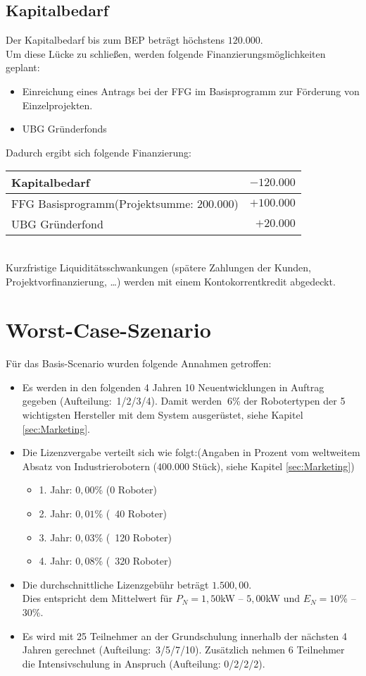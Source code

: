 \subsection{Kapitalbedarf}
Der Kapitalbedarf bis zum BEP beträgt höchstens $120.000$\officialeuro.\\
Um diese Lücke zu schließen, werden folgende Finanzierungsmöglichkeiten geplant:
\begin{itemize}
	\item Einreichung eines Antrags bei der FFG im Basisprogramm zur Förderung von Einzelprojekten.
	\item UBG Gründerfonds
\end{itemize}
Dadurch ergibt sich folgende Finanzierung:\\
\begin{tabular}{l r}
	Kapitalbedarf & $-120.000$\officialeuro \\
	\hline
	FFG Basisprogramm(Projektsumme: $200.000$\officialeuro) & $+100.000$\officialeuro \\
	UBG Gründerfond & $+20.000$\officialeuro \\
	\bottomrule
\end{tabular}\\

\noindent Kurzfristige Liquiditätsschwankungen (spätere Zahlungen der Kunden, Projektvorfinanzierung, …) werden mit einem Kontokorrentkredit abgedeckt.

\newpage
\section{Worst-Case-Szenario}
Für das Basis-Scenario wurden folgende Annahmen getroffen:
\begin{itemize}
	\item Es werden in den folgenden 4 Jahren 10 Neuentwicklungen in Auftrag gegeben (Aufteilung:~1/2/3/4). Damit werden $~6$\% der Robotertypen der 5 wichtigsten Hersteller mit dem System ausgerüstet, siehe Kapitel \ref{sec:Marketing}.
	\item Die Lizenzvergabe verteilt sich wie folgt:\newline (Angaben in Prozent vom weltweitem Absatz von Industrierobotern ($400.000$ Stück), siehe Kapitel \ref{sec:Marketing})
	\begin{itemize}
		\item 1. Jahr: $0,00$\% (0 Roboter)
		\item 2. Jahr: $0,01$\% (~40 Roboter)
		\item 3. Jahr: $0,03$\% (~120 Roboter)
		\item 4. Jahr: $0,08$\% (~320 Roboter)
	\end{itemize}
	\item Die durchschnittliche Lizenzgebühr beträgt $1.500,00$\officialeuro.\\ Dies entspricht dem Mittelwert für $P_N = 1,50$kW -- $5,00$kW und $E_N = 10$\% -- $30$\%.
	\item Es wird mit 25 Teilnehmer an der Grundschulung innerhalb der nächsten 4 Jahren gerechnet (Aufteilung:~3/5/7/10). Zusätzlich nehmen 6 Teilnehmer die Intensivschulung in Anspruch (Aufteilung: 0/2/2/2).
\end{itemize}

